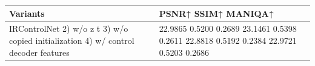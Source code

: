 \begin{tabular}{ll}
\toprule
Variants & PSNR↑ SSIM↑ MANIQA↑ \\
\midrule
IRControlNet 2) w/o z t 3) w/o copied initialization 4) w/ control decoder features & 22.9865 0.5200 0.2689 23.1461 0.5398 0.2611 22.8818 0.5192 0.2384 22.9721 0.5203 0.2686 \\
\bottomrule
\end{tabular}
